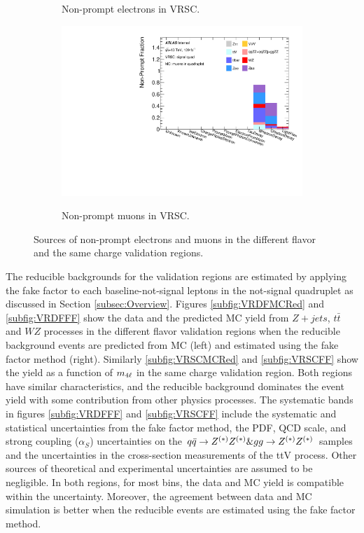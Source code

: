 \begin{figure}[htb]
\begin{subfigure}{.48\textwidth}
    \caption{Non-prompt electrons in VRSC.}
    \end{subfigure}
    \begin{subfigure}{.48\textwidth}
        \centering
		{\includegraphics[width=.9\linewidth]{figures/Analysis/Background/NonPromptCRSCSignal_Muons_.pdf}}\\
        \caption{Non-prompt muons in VRSC.}
    \end{subfigure}
	\caption{ Sources of non-prompt electrons and muons in the different flavor and the same charge validation regions.\label{fig:VRNonPromptComposition}}
\end{figure}

The reducible backgrounds for the validation regions are estimated by applying the fake factor to each baseline-not-signal leptons in the not-signal quadruplet as discussed in Section \ref{subsec:Overview}. Figures  \ref{subfig:VRDFMCRed} and \ref{subfig:VRDFFF} show the data and the predicted MC yield from $Z+jets$, $t\bar{t}$ and $WZ$ processes in the different flavor validation regions when the reducible background events are predicted from MC (left) and estimated using the fake factor method (right). Similarly \ref{subfig:VRSCMCRed} and \ref{subfig:VRSCFF} show the yield as a function of $m_{4\ell}$ in the same charge validation region. Both regions have similar characteristics, and the reducible background dominates the event yield with some contribution from other physics processes. The systematic bands in figures \ref{subfig:VRDFFF} and \ref{subfig:VRSCFF} include the systematic and statistical uncertainties from the fake factor method, the PDF, QCD scale, and strong coupling ($\alpha_{S}$) uncertainties on the $q\bar{q}\to Z^{(*)}Z^{(*)} \& gg\to Z^{(*)}Z^{(*)}$ samples and the uncertainties in the cross-section measurements of the ttV process. Other sources of theoretical and experimental uncertainties are assumed to be negligible. In both regions, for most bins, the data and MC yield is compatible within the uncertainty. Moreover, the agreement between data and MC simulation is better when the reducible events are estimated using the fake factor method. 

